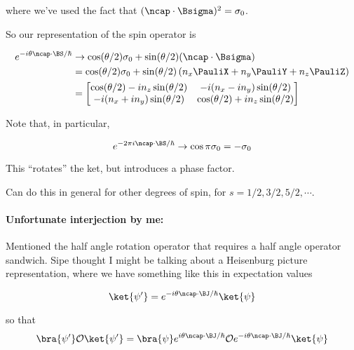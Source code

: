 where we've used the fact that $(\ncap \cdot \Bsigma)^2 = \sigma_0$.

So our representation of the spin operator is

\begin{equation}\label{eqn:qmTwoL15:30}
\begin{aligned}
e^{-i \theta \ncap \cdot \BS/\hbar} 
&\rightarrow
\cos(\theta/2) \sigma_0 + \sin(\theta/2) (\ncap \cdot \Bsigma) \\
&=
\cos(\theta/2) \sigma_0 + \sin(\theta/2) 
\left(n_x \PauliX + n_y \PauliY + n_z \PauliZ \right) \\
&=
\begin{bmatrix}
\cos(\theta/2) -i n_z \sin(\theta/2) & -i (n_x -i n_y) \sin(\theta/2) \\
-i (n_x + i n_y) \sin(\theta/2) & \cos(\theta/2) +i n_z \sin(\theta/2) 
\end{bmatrix}
\end{aligned}
\end{equation}

Note that, in particular, 

\begin{equation}\label{eqn:qmTwoL15:50}
e^{-2 \pi i \ncap \cdot \BS/\hbar} \rightarrow \cos\pi \sigma_0 = -\sigma_0
\end{equation}

This ``rotates'' the ket, but introduces a phase factor.

Can do this in general for other degrees of spin, for $s = 1/2, 3/2, 5/2, \cdots$.

\paragraph{Unfortunate interjection by me:} Mentioned the half angle rotation operator that requires a half angle operator sandwich.  Sipe thought I might be talking about a Heisenburg picture representation, where we have something like this in expectation values

\begin{equation}\label{eqn:qmTwoL15:70}
\ket{\psi'} = e^{-i \theta \ncap \cdot \BJ/\hbar} \ket{\psi}
\end{equation}

so that 
\begin{equation}\label{eqn:qmTwoL15:90}
\bra{\psi'}
\mathcal{O}
\ket{\psi'} = \bra{\psi} 
e^{i \theta \ncap \cdot \BJ/\hbar} 
\mathcal{O}
e^{-i \theta \ncap \cdot \BJ/\hbar} 
\ket{\psi}
\end{equation}

